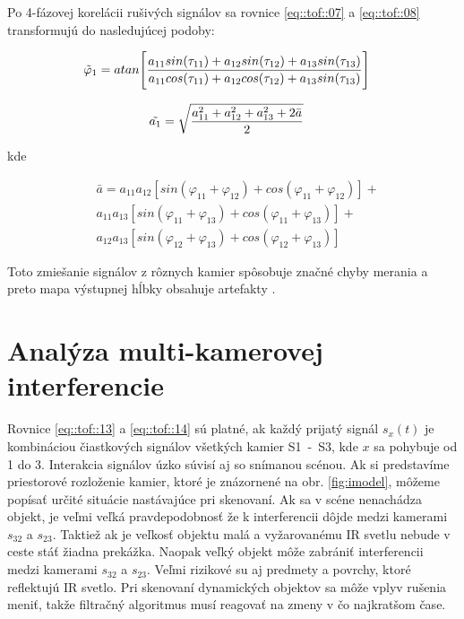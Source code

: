 \noindent  Po 4-fázovej korelácii rušivých signálov sa rovnice \ref{eq::tof::07} a \ref{eq::tof::08} transformujú do nasledujúcej podoby:

\begin{equation}
\label{eq::tof::13}
\begin{aligned}
&{ \Tilde{\varphi}_1}= atan \Bigg[ {\frac{a_{11}  sin( \tau _{11}) + a_{12}  sin( \tau _{12}) + a_{13}  sin( \tau _{13})}{a_{11}  cos( \tau _{11}) + a_{12}  cos( \tau _{12}) + a_{13}  sin( \tau _{13}) }} \Bigg]
\end{aligned}
\end{equation}

\begin{equation}
\label{eq::tof::14}
\begin{aligned}
&\Tilde{ a_1 }= {\sqrt{\frac{a_{11}^2+a_{12}^2+a_{13}^2 + 2\bar{a}}{2} }}
\end{aligned}
\end{equation}

\noindent kde

\begin{equation}
\label{eq::tof::15}
\begin{aligned}
&{\bar{a}} = {a_{11}a_{12}[sin({\varphi_{11}+\varphi_{12}}) + cos({\varphi_{11}+\varphi_{12}})]} + \\  
&{a_{11}a_{13}[sin({\varphi_{11}+\varphi_{13}}) + cos ({\varphi_{11}+\varphi_{13}})]} + \\
&{a_{12}a_{13}[sin({\varphi_{12}+\varphi_{13}}) + cos ({\varphi_{12}+\varphi_{13}})]}
\end{aligned}
\end{equation}

Toto zmiešanie signálov z rôznych kamier spôsobuje značné chyby merania a preto mapa výstupnej hĺbky obsahuje artefakty \cite{Lianhua}.

\section{Analýza multi-kamerovej interferencie}

Rovnice \ref{eq::tof::13} a \ref{eq::tof::14} sú platné, ak každý prijatý signál $s_{x}(t)$ je kombináciou čiastkových signálov všetkých kamier S1\, - \,S3, kde $x$ sa pohybuje od 1 do 3.
Interakcia signálov úzko súvisí aj so snímanou scénou. Ak si predstavíme priestorové rozloženie kamier, ktoré je znázornené na obr. \ref{fig:imodel}, môžeme popísať určité situácie nastávajúce pri skenovaní. Ak sa v scéne nenachádza objekt, je veľmi veľká pravdepodobnosť že k interferencii dôjde medzi kamerami $s_{32}$ a $s_{23}$. Taktiež ak je veľkosť objektu malá a vyžarovanému IR svetlu nebude v ceste stáť žiadna prekážka. Naopak veľký objekt môže zabrániť interferencii medzi kamerami $s_{32}$ a $s_{23}$. Veľmi rizikové su aj predmety a povrchy, ktoré reflektujú IR svetlo. Pri skenovaní dynamických objektov sa môže vplyv rušenia meniť, takže filtračný algoritmus musí reagovať na zmeny v čo najkratšom čase.

